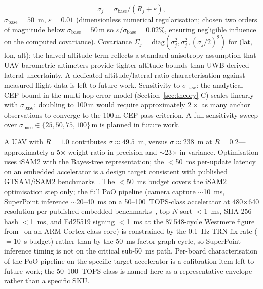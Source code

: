 \documentclass[journal,10pt,twocolumn]{IEEEtran}
\begin{document}
\begin{itemize}
    \begin{equation}
    \sigma_j = \sigma_\text{base} / (R_j + \varepsilon),
    \label{eq:noise_rep}
    \end{equation}
    $\sigma_\text{base} = 50$~m, $\varepsilon = 0.01$ (dimensionless numerical regularisation; chosen two orders of magnitude below $\sigma_\text{base}=50$\,m so $\varepsilon/\sigma_\text{base}=0.02\%$, ensuring negligible influence on the computed covariance). Covariance $\Sigma_j = \mathrm{diag}(\sigma_j^2, \sigma_j^2, (\sigma_j/2)^2)$ for (lat, lon, alt); the halved altitude term reflects a standard anisotropy assumption that UAV barometric altimeters provide tighter altitude bounds than UWB-derived lateral uncertainty. A dedicated altitude/lateral-ratio characterisation against measured flight data is left to future work. Sensitivity to $\sigma_\text{base}$: the analytical CEP bound in the multi-hop error model (Section~\ref{sec:theory}-C) scales linearly with $\sigma_\text{base}$; doubling to 100\,m would require approximately $2\times$ as many anchor observations to converge to the 100\,m CEP pass criterion. A full sensitivity sweep over $\sigma_\text{base} \in \{25, 50, 75, 100\}$\,m is planned in future work.
\end{itemize}
A UAV with $R = 1.0$ contributes $\sigma \approx 49.5$~m, versus $\sigma \approx 238$~m at $R = 0.2$---approximately a 5$\times$ weight ratio in precision and $\sim$23$\times$ in variance. Optimisation uses iSAM2 with the Bayes-tree representation; the $<$50~ms per-update latency on an embedded accelerator is a design target consistent with published GTSAM/iSAM2 benchmarks~\cite{kaess2012isam2}. The $<$50~ms budget covers the iSAM2 optimisation step only; the full PoO pipeline (camera capture $\sim$10~ms, SuperPoint inference $\sim$20--40~ms on a 50--100~TOPS-class accelerator at 480$\times$640 resolution per published embedded benchmarks~\cite{detone2018superpoint}, top-$N$ sort $<$1~ms, SHA-256 hash $<$1~ms, and Ed25519 signing $<$1~ms at the 87\,548-cycle Westmere figure from~\cite{bernstein2012ed25519} on an ARM Cortex-class core) is constrained by the 0.1~Hz TRN fix rate ($=$10~s budget) rather than by the 50~ms factor-graph cycle, so SuperPoint inference timing is not on the critical sub-50~ms path. Per-board characterisation of the PoO pipeline on the specific target accelerator is a calibration item left to future work; the 50--100~TOPS class is named here as a representative envelope rather than a specific SKU.%
\end{document}
